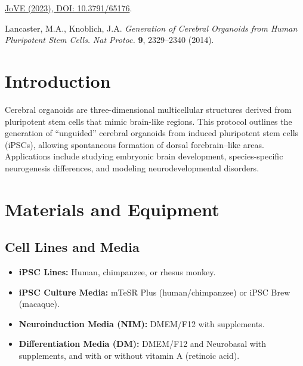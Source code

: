 \documentclass[11pt]{article}
\begin{document}
\begin{enumerate}[label={[\arabic*]}]
    \item \href{https://doi.org/10.3791/65176}{JoVE (2023), DOI: 10.3791/65176}.
    \item Lancaster, M.A., Knoblich, J.A. \textit{Generation of Cerebral Organoids from Human Pluripotent Stem Cells.} \textit{Nat Protoc.} \textbf{9}, 2329--2340 (2014).
\end{enumerate}

\section{Introduction}

Cerebral organoids are three-dimensional multicellular structures derived from pluripotent stem cells that mimic brain-like regions. This protocol outlines the generation of “unguided” cerebral organoids from induced pluripotent stem cells (iPSCs), allowing spontaneous formation of dorsal forebrain–like areas. Applications include studying embryonic brain development, species-specific neurogenesis differences, and modeling neurodevelopmental disorders.

\section{Materials and Equipment}

\subsection{Cell Lines and Media}
\begin{itemize}[leftmargin=*]
    \item \textbf{iPSC Lines:} Human, chimpanzee, or rhesus monkey.
    \item \textbf{iPSC Culture Media:} mTeSR Plus (human/chimpanzee) or iPSC Brew (macaque).
    \item \textbf{Neuroinduction Media (NIM):} DMEM/F12 with supplements.
    \item \textbf{Differentiation Media (DM):} DMEM/F12 and Neurobasal with supplements, and with or without vitamin A (retinoic acid).
\end{itemize}
\end{document}
